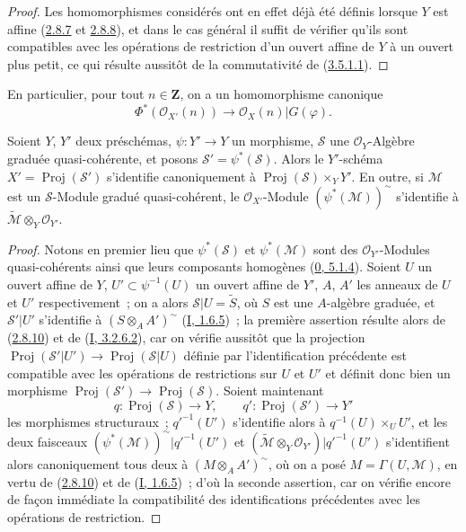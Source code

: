 \begin{proof}
Les homomorphismes considérés ont en effet déjà été définis lorsque $Y$ est
affine (\hyperref[II.2.8.7-fr]{2.8.7} et
\hyperref[II.2.8.8-fr]{2.8.8}), et dans le cas général il suffit de vérifier
qu'ils sont compatibles avec les opérations de restriction d'un ouvert
affine de $Y$ à un ouvert plus petit, ce qui résulte aussitôt de la
commutativité de (\hyperref[II.3.5.1.1-fr]{3.5.1.1}).
\end{proof}

En particulier, pour tout $n\in\mathbf{Z}$, on a un homomorphisme canonique
\[
\label{II.3.5.2.1-fr}
  \Phi^*(\mathcal{O}_{X'}(n))\longrightarrow
  \mathcal{O}_X(n)|G(\varphi).
\tag{3.5.2.1}
\]

\begin{proposition}[3.5.3]
\label{II.3.5.3-fr}
Soient $Y$, $Y'$ deux préschémas, $\psi:Y'\to Y$ un morphisme,
$\mathcal{S}$ une $\mathcal{O}_Y$-Algèbre graduée quasi-cohérente, et posons
$\mathcal{S}'=\psi^*(\mathcal{S})$. Alors le $Y'$-schéma
$X'=\operatorname{Proj}(\mathcal{S}')$ s'identifie canoniquement à
$\operatorname{Proj}(\mathcal{S})\times_Y Y'$. En outre, si $\mathcal{M}$ est
un $\mathcal{S}$-Module gradué quasi-cohérent, le $\mathcal{O}_{X'}$-Module
$(\psi^*(\mathcal{M}))^{\sim}$ s'identifie à
$\widetilde{\mathcal{M}}\otimes_Y\mathcal{O}_{Y'}$.
\end{proposition}

\begin{proof}
Notons en premier lieu que $\psi^*(\mathcal{S})$ et
$\psi^*(\mathcal{M})$ sont des $\mathcal{O}_{Y'}$-Modules quasi-cohérents
ainsi que leurs composants homogènes
(\hyperref[0.5.1.4-fr]{0, 5.1.4}). Soient $U$ un ouvert affine de $Y$,
$U'\subset\psi^{-1}(U)$ un ouvert affine de $Y'$, $A$, $A'$ les anneaux de
$U$ et $U'$ respectivement~; on a alors
$\mathcal{S}|U=\widetilde{S}$, où $S$ est une $A$-algèbre graduée, et
$\mathcal{S}'|U'$ s'identifie à $(S\otimes_A A')^{\sim}$
(\hyperref[I.1.6.5-fr]{I, 1.6.5})~; la première assertion résulte alors de
(\hyperref[II.2.8.10-fr]{2.8.10}) et de
(\hyperref[I.3.2.6.2-fr]{I, 3.2.6.2}), car on vérifie aussitôt que la
projection
$\operatorname{Proj}(\mathcal{S}'|U')\to
\operatorname{Proj}(\mathcal{S}|U)$ définie par l'identification précédente
est compatible avec les opérations de restrictions sur $U$ et $U'$ et
définit donc bien un morphisme
$\operatorname{Proj}(\mathcal{S}')\to\operatorname{Proj}(\mathcal{S})$.
Soient maintenant
\[
  q:\operatorname{Proj}(\mathcal{S})\to Y,
  \qquad q':\operatorname{Proj}(\mathcal{S}')\to Y'
\]
les morphismes structuraux~; $q'^{-1}(U')$ s'identifie alors à
$q^{-1}(U)\times_U U'$, et les deux faisceaux
$(\psi^*(\mathcal{M}))^{\sim}|q'^{-1}(U')$ et
$(\widetilde{\mathcal{M}}\otimes_Y\mathcal{O}_{Y'})|q'^{-1}(U')$
s'identifient alors canoniquement tous deux à $(M\otimes_A A')^{\sim}$, où
on a posé $M=\Gamma(U,\mathcal{M})$, en vertu de
(\hyperref[II.2.8.10-fr]{2.8.10}) et de
(\hyperref[I.1.6.5-fr]{I, 1.6.5})~; d'où la seconde assertion, car on vérifie
encore de façon immédiate la compatibilité des identifications précédentes
avec les opérations de restriction.
\end{proof}

